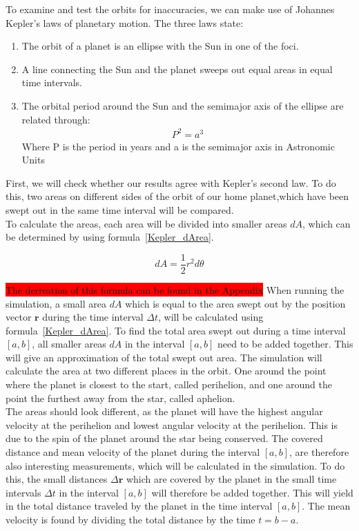 \documentclass[reprint,english,notitlepage]{revtex4-2}
\begin{document}
To examine and test the orbits for inaccuracies, we can make use of Johannes Kepler's laws of planetary motion.
The three laws state:
\begin{enumerate}
    \item The orbit of a planet is an ellipse with the
		Sun in one of the foci.
	\item A line connecting the Sun and the planet
		sweeps out equal areas in equal time intervals.
	\item The orbital period around the Sun and the
		semimajor axis of the ellipse are related through:
		\begin{align*}
		    P^2 = a^3
		\end{align*}
		Where P is the period in years and a is the semimajor axis in Astronomic Units%
\end{enumerate}

First, we will check whether our results agree with Kepler's second law.
To do this, two areas on different sides of the orbit of our home planet,which have been swept out in the same time interval will be compared.\\
To calculate the areas, each area will be divided into smaller areas $dA$, which can be determined by using formula~\eqref{Kepler_dArea}.

\begin{equation} \label{Kepler_dArea}
    dA = \frac{1}{2}r^2 d\theta 
\end{equation}

\colorbox{red}{The derivation of this formula can be found in the Appendix}
When running the simulation, a small area $dA$ which is equal to the area swept out by the position vector $\textbf{r}$ during the time interval $\Delta t$, will be calculated using formula~\eqref{Kepler_dArea}.
To find the total area swept out during a time interval $[a, b]$, all smaller areas $dA$ in the interval $[a, b]$ need to be added together.
This will give an approximation of the total swept out area.
The simulation will calculate the area at two different places in the orbit.
One around the point where the planet is closest to the start, called perihelion, and one around the point the furthest away from the star, called aphelion.\\
The areas should look different, as the planet will have the highest angular velocity at the perihelion and lowest angular velocity at the perihelion.
This is due to the spin of the planet around the star being conserved.
The covered distance and mean velocity of the planet during the interval $[a, b]$, are therefore also interesting measurements, which will be calculated in the simulation.
To do this, the small distances $\Delta \textbf{r}$ which are covered by the planet in the small time intervals $\Delta t$ in the interval $[a, b]$ will therefore be added together.
This will yield in the total distance traveled by the planet in the time interval $[a, b]$.
The mean velocity is found by dividing the total distance by the time $t = b-a$.\newline
\end{document}
